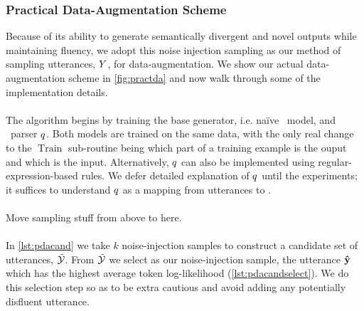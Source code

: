 \subsubsection{Practical Data-Augmentation Scheme}




Because of its ability to generate semantically divergent and novel
outputs while maintaining fluency, we adopt this noise injection
sampling as our method of sampling utterances, $Y$, for 
data-augmentation. We show our actual data-augmentation scheme in
\autoref{fig:practda} and now walk through some of the implementation details.

\paragraph{}
The algorithm begins by training the base generator, i.e. na{\"i}ve 
\sequencetosequence~model, and \meaningrepresentation~parser $q$. 
Both models are trained on the same data, with the only real change to the 
$\operatorname{Train}$ sub-routine being which part of a training example
is the ouput and which is the input. Alternatively, $q$ can 
also be implemented using regular-expression-based rules. We defer detailed 
explanation of $q$ until the experiments; it suffices to understand
$q$ as a mapping from utterances to \meaningrepresentations.




\paragraph{}
Move sampling stuff from above to here.

\paragraph{}
    In \autoref{lst:pdacand} we take $k$ noise-injection samples to construct
    a candidate set of utterances, $\mathcal{\tilde{\mathcal{Y}}}$. From $\mathcal{\tilde{\mathcal{Y}}}$ we
    select as our noise-injection sample, the utterance $\boldsymbol{\hat{\mathbf{y}}}$
    which has the highest average token log-likelihood (\autoref{lst:pdacandselect}). We do this selection step so as to be extra cautious and avoid adding
    any potentially disfluent utterance. 
    
